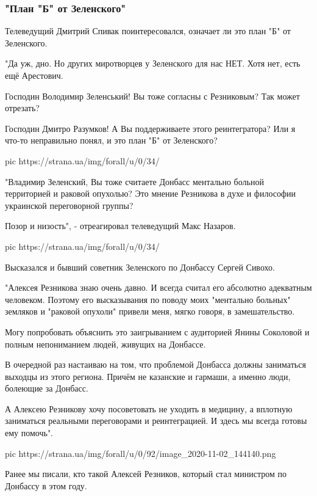 \subsubsection{"План "Б" от Зеленского"}

Телеведущий  Дмитрий Спивак поинтересовался, означает ли это план "Б" от
Зеленского.

"Да уж, дно. Но других миротворцев у Зеленского для нас НЕТ. Хотя нет, есть ещё
Арестович.

Господин Володимир Зеленський! Вы тоже согласны с Резниковым? Так может
отрезать?

Господин Дмитро Разумков! А Вы поддерживаете этого реинтегратора? Или я что-то
неправильно понял, и это план "Б" от Зеленского?

\ifcmt
pic https://strana.ua/img/forall/u/0/34/%
\fi

"Владимир Зеленский, Вы тоже считаете Донбасс ментально больной территорией и
раковой опухолью? Это мнение Резникова в духе и философии украинской
переговорной группы?

Позор и низость", - отреагировал телеведущий Макс Назаров.

\ifcmt
pic https://strana.ua/img/forall/u/0/34/%
\fi

Высказался и бывший советник Зеленского по Донбассу Сергей Сивохо.

"Алексея Резникова знаю очень давно. И всегда считал его абсолютно адекватным
человеком. Поэтому его высказывания по поводу моих "ментально больных" земляков
и "раковой опухоли" привели меня, мягко говоря, в замешательство.

Могу попробовать объяснить это заигрыванием с аудиторией Янины Соколовой и
полным непониманием людей, живущих на Донбассе.

В очередной раз настаиваю на том, что проблемой Донбасса должны заниматься
выходцы из этого региона. Причём не казанские и гармаши, а именно люди,
болеющие за Донбасс.

А Алексею Резникову хочу посоветовать не уходить в медицину, а вплотную
заниматься реальными переговорами и реинтеграцией. И здесь мы всегда готовы ему
помочь". 

\ifcmt
pic https://strana.ua/img/forall/u/0/92/image_2020-11-02_144140.png
\fi

Ранее мы писали, кто такой Алексей Резников, который стал министром по Донбассу
в этом году.

